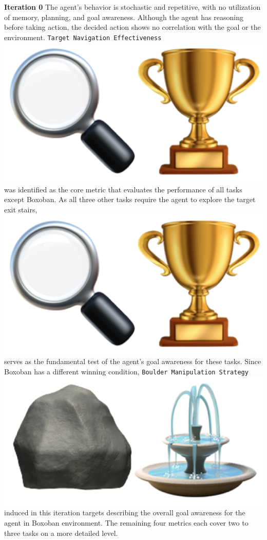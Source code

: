 \begin{flushleft}
\textbf{Iteration 0}
The agent's behavior is stochastic and repetitive, with no utilization of memory, planning, and goal awareness. Although the agent has reasoning before taking action, the decided action shows no correlation with the goal or the environment. \texttt{Target Navigation Effectiveness} \includegraphics[scale=0.07]{figs/emojis/mini_1.png} was identified as the core metric that evaluates the performance of all tasks except Boxoban. As all three other tasks require the agent to explore the target exit stairs, \includegraphics[scale=0.07]{figs/emojis/mini_1.png} serves as the fundamental test of the agent's goal awareness for these tasks. Since Boxoban has a different winning condition, \texttt{Boulder Manipulation Strategy} \includegraphics[scale=0.07]{figs/emojis/mini_4.png} induced in this iteration targets describing the overall goal awareness for the agent in Boxoban environment. The remaining four metrics each cover two to three tasks on a more detailed level.


\end{flushleft}
